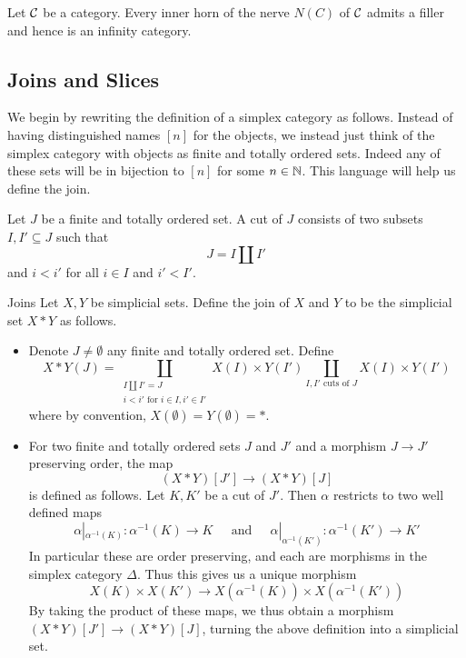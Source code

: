 \documentclass[a4paper]{article}
\begin{document}
\begin{thm}{}{} Let $\mathcal{C}$ be a category. Every inner horn of the nerve $N(C)$ of $\mathcal{C}$ admits a filler and hence is an infinity category. 
\end{thm}

\subsection{Joins and Slices}
We begin by rewriting the definition of a simplex category as follows. Instead of having distinguished names $[n]$ for the objects, we instead just think of the simplex category with objects as finite and totally ordered sets. Indeed any of these sets will be in bijection to $[n]$ for some $n\in\mathbb{N}$. This language will help us define the join. 

\begin{defn}{}{} Let $J$ be a finite and totally ordered set. A cut of $J$ consists of two subsets $I,I'\subseteq J$ such that $$J=I\amalg I'$$ and $i<i'$ for all $i\in I$ and $i'<I'$. 
\end{defn}

\begin{defn}{Joins}{} Let $X,Y$ be simplicial sets. Define the join of $X$ and $Y$ to be the simplicial set $X\ast Y$ as follows. 
\begin{itemize}
\item Denote $J\neq\emptyset$ any finite and totally ordered set. Define $$X\ast Y(J)=\coprod_{\substack{I\amalg I'=J\\i<i'\text{ for }i\in I,i'\in I'}}X(I)\times Y(I')\coprod_{I,I'\text{ cuts of }J}X(I)\times Y(I')$$ where by convention, $X(\emptyset)=Y(\emptyset)=\ast$. 
\item For two finite and totally ordered sets $J$ and $J'$ and a morphism $J\to J'$ preserving order, the map $$(X\ast Y)[J']\to(X\ast Y)[J]$$ is defined as follows. Let $K,K'$ be a cut of $J'$. Then $\alpha$ restricts to two well defined maps $$\alpha|_{\alpha^{-1}(K)}:\alpha^{-1}(K)\to K\;\;\;\;\text{ and }\;\;\;\;\alpha|_{\alpha^{-1}(K')}:\alpha^{-1}(K')\to K'$$ In particular these are order preserving, and each are morphisms in the simplex category $\Delta$. Thus this gives us a unique morphism $$X(K)\times X(K')\to X(\alpha^{-1}(K))\times X(\alpha^{-1}(K'))$$ By taking the product of these maps, we thus obtain a morphism $(X\ast Y)[J']\to(X\ast Y)[J]$, turning the above definition into a simplicial set. 
\end{itemize}
\end{defn}
\end{document}
